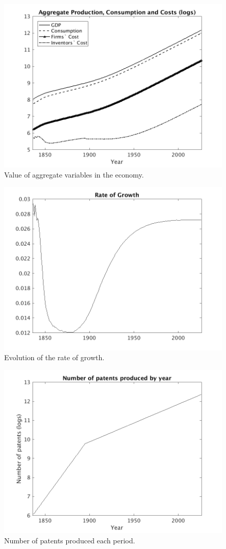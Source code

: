 \documentclass[serif]{article}
\theoremstyle{definition}
\begin{document}
\begin{figure}[h!]
\centering
\includegraphics[width=.7\textwidth]{figures/5_years/aggregates.png}
\caption{Value of aggregate variables in the economy.}
\end{figure}

\begin{figure}[h!]
\centering
\includegraphics[width=.7\textwidth]{figures/5_years/growth.png}
\caption{Evolution of the rate of growth.}
\end{figure}

\begin{figure}[h!]
\centering
\includegraphics[width=.7\textwidth]{figures/5_years/num_pats.png}
\caption{Number of patents produced each period.}
\end{figure}
\end{document}
